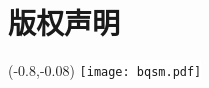\chapter*{版权声明}
\thispagestyle{empty}

\begin{textblock}{1}(-0.8,-0.08)
    \colorbox{white}{
        \texttt{[image: bqsm.pdf]}
    }
\end{textblock}
